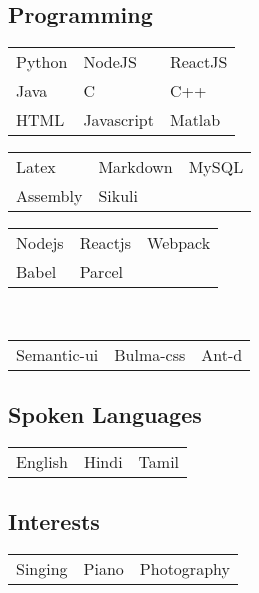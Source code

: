 \documentclass[]{surya-resume}
\begin{document}
\begin{minipage}[t]{0.33\textwidth}
\subsection{Programming}
\begin{tabular}{lll}
\textbullet{} Python &\textbullet{} NodeJS &\textbullet{} ReactJS\\
\textbullet{} Java &\textbullet{} C &\textbullet{} C++\\
\textbullet{} HTML &\textbullet{} Javascript &\textbullet{} Matlab\\
\end{tabular}

\sectionsep
{}
\begin{tabular}{lll}
\textbullet{} Latex &\textbullet{} Markdown &\textbullet{} MySQL\\
\textbullet{} Assembly &\textbullet{} Sikuli \\
\end{tabular}

\sectionsep
{}
\begin{tabular}{lll}
\textbullet{} Nodejs &\textbullet{} Reactjs &\textbullet{} Webpack \\
\textbullet{} Babel &\textbullet{} Parcel \\
\end{tabular}\\
\sectionsep
{}
\begin{tabular}{lll}
\textbullet{} Semantic-ui &\textbullet{} Bulma-css &\textbullet{} Ant-d\\
\end{tabular}
\sectionsep
\subsection{Spoken Languages}
\begin{tabular}{lll}
\textbullet{} English &\textbullet{} Hindi &\textbullet{} Tamil
\end{tabular}
\sectionsep
\subsection{Interests}
\begin{tabular}{lll}
\textbullet{} Singing&\textbullet{} Piano&\textbullet{} Photography
\end{tabular}
\sectionsep

%
%

\end{minipage} 
\end{document}
